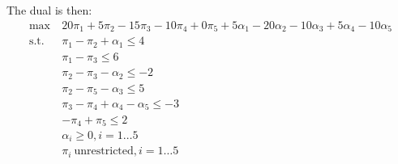 \documentclass[12pt]{article}
\begin{document}
\begin{enumerate}
    The dual is then:\\
    \begin{equation}
      \begin{split}
        \text{max}\ &20\pi_1+5\pi_2-15\pi_3-10\pi_4+0\pi_5+5\alpha_1-20\alpha_2-10\alpha_3+5\alpha_4-10\alpha_5\\
        \text{s.t.}\ &\pi_1-\pi_2+\alpha_1\leq4\\
        &\pi_1-\pi_3\leq6\\
        &\pi_2-\pi_3-\alpha_2\leq-2\\
        &\pi_2-\pi_5-\alpha_3\leq5\\
        &\pi_3-\pi_4+\alpha_4-\alpha_5\leq-3\\
        &-\pi_4+\pi_5\leq2\\
        &\alpha_i\geq0,i=1\ldots5\\
        &\pi_i\ \text{unrestricted},i=1\ldots5\\
      \end{split}
    \end{equation}


\end{enumerate}
\end{document}
